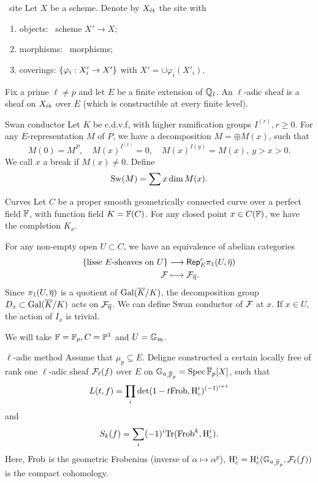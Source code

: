 \documentclass[aspectratio=169,handout]{beamer}
\begin{document}
\begin{frame}{\Etale\ site}
Let $X$ be a scheme. Denote by $X_{\text{\'{e}t}}$ the site with
\begin{enumerate}
\item objects: \etale\ scheme $X'\to X$;
\item morphisms: \etale\ morphisms;
\item coverings: ${\left\{\varphi_i:X'_i\to X'\right\}}$ with $X'=\cup \varphi_i(X'_i)$.
\end{enumerate} \pause
Fix a prime $\ell\neq p$ and let $E$ be a finite extension of ${\mathbb{Q}}_\ell$.
An $\ell$-adic sheaf is a sheaf on $X_{\text{\'{e}t}}$ over $E$ (which is constructible at every finite level).
\end{frame}


\begin{frame}{Swan conductor}
Let $K$ be c.d.v.f, with higher ramification groups $I^{(r)},r\ge 0$. \pause
For any $E$-representation $M$ of $P$, we have a decomposition $M=\oplus M(x)$, such that
	\[M(0)=M^P,\quad M(x)^{I^{(x)}}=0,\quad M(x)^{I(y)}=M(x), \ y>x>0.\]
	\pause We call $x$ a break if $M(x)\neq 0$. Define
	\[{\mathrm{Sw}}(M)=\sum x\dim M(x).\]
\end{frame}


\begin{frame}{Curves}
Let $C$ be a proper smooth geometrically connected curve over a perfect field ${\mathbb{F}}$, with function field $K={\mathbb{F}}(C)$.
For any closed point $x\in C({\mathbb{F}})$, we have the completion $K_x$.

\pause
For any non-empty open $U\subset C$, we have an equivalence of abelian categories
	\[\begin{split}
		{\left\{\text{lisse $E$-sheaves on $U$}\right\}}&\longrightarrow{\mathsf{Rep}}_E^c \pi_1(U,\overline\eta)\\
		{\mathcal{F}}&\longmapsto {\mathcal{F}}_{\overline\eta}.
	\end{split}\]
	\pause
Since $\pi_1(U,\overline\eta)$ is a quotient of ${\mathrm{Gal}}(\overline K/K)$, the decomposition group $D_x\subset {\mathrm{Gal}}(\overline K/K)$ acts on ${\mathcal{F}}_{\overline\eta}$.
We can define Swan conductor of ${\mathcal{F}}$ at $x$.
If $x\in U$, the action of $I_x$ is trivial.

We will take ${\mathbb{F}}={\mathbb{F}}_p,C={\mathbb{P}}^1$ and $U=\mathbb{G}_m$.
\end{frame}


\begin{frame}{$\ell$-adic method}
Assume that $\mu_p\subseteq E$.
Deligne constructed a certain locally free of rank one $\ell$-adic sheaf ${\mathcal{F}}_\ell(f)$ over $E$ on ${\mathbb{G}_a}_{,\overline{{\mathbb{F}}}_p}=\operatorname{Spec} \overline{{\mathbb{F}}}_p[X]$, such that
	\[L(t,f)=\prod_i \det(1-t {\mathrm{Frob}},{\mathrm{H}}^i_c)^{(-1)^{i+1}}\]
and
	\[S_k(f)=\sum_i (-1)^i{\mathrm{Tr}}({\mathrm{Frob}}^k,{\mathrm{H}}_c^i).\]
Here, ${\mathrm{Frob}}$ is the geometric Frobenius (inverse of $\alpha\mapsto \alpha^p$), ${\mathrm{H}}_c^i={\mathrm{H}}_c^i({\mathbb{G}_a}_{,\overline{{\mathbb{F}}}_p},{\mathcal{F}}_\ell(f))$ is the compact cohomology.
\end{frame}
\end{document}
